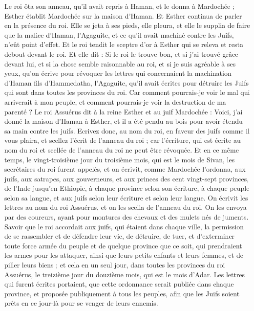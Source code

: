 \begin{multicols}{2}
Le roi ôta son anneau, qu'il avait repris à Haman, et le donna à Mardochée ; Esther établit Mardochée sur la maison d'Haman.
Et Esther continua de parler en la présence du roi. Elle se jeta à ses pieds, elle pleura, et elle le supplia de faire que la malice d’Haman, l’Agaguite, et ce qu’il avait machiné contre les Juifs, n’eût point d’effet.
Et le roi tendit le sceptre d'or à Esther qui se releva et resta debout devant le roi.
Et elle dit : Si le roi le trouve bon, et si j’ai trouvé grâce devant lui, et si la chose semble raisonnable au roi, et si je suis agréable à ses yeux, qu’on écrive pour révoquer les lettres qui concernaient la machination d’Haman fils d’Hammedatha, l’Agaguite, qu’il avait écrites pour détruire les Juifs qui sont dans toutes les provinces du roi.
Car comment pourrais-je voir le mal qui arriverait à mon peuple, et comment pourrais-je voir la destruction de ma parenté ?
Le roi Assuérus dit à la reine Esther et au juif Mardochée : Voici, j'ai donné la maison d'Haman à Esther, et il a été pendu au bois pour avoir étendu sa main contre les juifs.
Ecrivez donc, au nom du roi, en faveur des juifs comme il vous plaira, et scellez l'écrit de l'anneau du roi ; car l’écriture, qui est écrite au nom du roi et scellée de l'anneau du roi ne peut être révoquée.
Et en ce même temps, le vingt-troisième jour du troisième mois, qui est le mois de Sivan, les secrétaires du roi furent appelés, et on écrivit, comme Mardochée l’ordonna, aux juifs, aux satrapes, aux gouverneurs, et aux princes des cent vingt-sept provinces, de l’Inde jusqu'en Ethiopie, à chaque province selon son écriture, à chaque peuple selon sa langue, et aux juifs selon leur écriture et selon leur langue.
On écrivit les lettres au nom du roi Assuérus, et on les scella de l'anneau du roi. On les envoya par des coureurs, ayant pour montures des chevaux et des mulets nés de juments.
Savoir que le roi accordait aux juifs, qui étaient dans chaque ville, la permission de se rassembler et de défendre leur vie, de détruire, de tuer, et d’exterminer toute force armée du peuple et de quelque province que ce soit, qui prendraient les armes pour les attaquer, ainsi que leurs petits enfants et leurs femmes, et de piller leurs biens ;
et cela en un seul jour, dans toutes les provinces du roi Assuérus, le treizième jour du douzième mois, qui est le mois d'Adar.
Les lettres qui furent écrites portaient, que cette ordonnance serait publiée dans chaque province, et proposée publiquement à tous les peuples, afin que les Juifs soient prêts en ce jour-là pour se venger de leurs ennemis.

\end{multicols}
